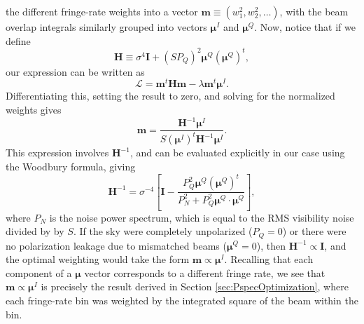 \documentclass[twocolumn,apj,numberedappendix]{emulateapj}
\begin{document}
the different fringe-rate weights into a vector $\mathbf{m}\equiv( w_1^2, w_2^2, \dots )$, with the beam overlap integrals similarly grouped into
vectors $\boldsymbol \mu^I$ and $\boldsymbol \mu^Q$. Now, notice that if we define
\begin{equation}
\mathbf{H} \equiv \sigma^4 \mathbf{I} + \left(S P_Q \right)^2 \boldsymbol \mu^Q (\boldsymbol \mu^Q)^t,
\end{equation}
our expression can be written as
\begin{equation}
\mathcal L = \mathbf{m}^t \mathbf{H} \mathbf{m} - \lambda \mathbf{m}^t \boldsymbol \mu^I.
\end{equation}
Differentiating this, setting the result to zero, and solving for the normalized weights gives
\begin{equation}
\label{eq:PolOptWeights}
\mathbf{m} =  \frac{\mathbf{H}^{-1}  \boldsymbol \mu^I}{ S (\boldsymbol \mu^I)^t  \mathbf{H}^{-1}  \boldsymbol \mu^I}.
\end{equation}
This expression involves $\mathbf{H}^{-1}$, and can be evaluated explicitly in our case using the
Woodbury formula, giving
\begin{equation}
\label{eq:Hinv}
\mathbf{H}^{-1} = \sigma^{-4} \left[ \mathbf{I} - \frac{P_Q^2\boldsymbol \mu^Q (\boldsymbol \mu^Q)^t }{P_N^2 + P_Q^2 \boldsymbol \mu^Q \cdot \boldsymbol \mu^Q} \right],
\end{equation}
where $P_N$ is the noise power spectrum, which is equal to the RMS visibility
noise divided by by $S$. If the sky were completely unpolarized ($P_Q = 0$) or there were no polarization leakage due to mismatched beams ($\boldsymbol \mu^Q = 0$), then $\mathbf{H}^{-1} \propto \mathbf{I}$, and the optimal weighting would take the form
$\mathbf{m} \propto \boldsymbol \mu^I$. Recalling that each component of a $\boldsymbol \mu$ vector corresponds
to a different fringe rate, we see that $\mathbf{m} \propto \boldsymbol \mu^I$ is precisely the result derived in Section
\ref{sec:PspecOptimization}, where each fringe-rate bin was weighted by the integrated square of the beam within the bin.
\end{document}
